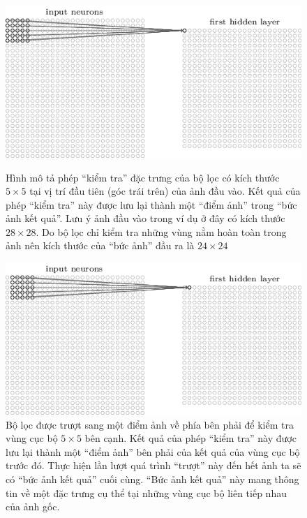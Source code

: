	\begin{figure}
		\centering
		\includegraphics[width=\textwidth]{cnn_first_filter}
		\caption[Phép tính đặc trưng của CNN]{Hình mô tả phép ``kiểm tra'' đặc trưng của bộ lọc có kích thước $5\times5$ tại vị trí đầu tiên (góc trái trên) của ảnh đầu vào.
		Kết quả của phép ``kiểm tra'' này được lưu lại thành một ``điểm ảnh'' trong ``bức ảnh kết quả''.
		Lưu ý ảnh đầu vào trong ví dụ ở đây có kích thước $28\times28$.
		Do bộ lọc chỉ kiểm tra những vùng nằm hoàn toàn trong ảnh nên kích thước của ``bức ảnh'' đầu ra là $24\times24$}
		\label{fig_cnn_filter}
		
		\includegraphics[width=\textwidth]{cnn_second_filter}
		\caption[Phép dịch chuyển bộ lọc của CNN]{Bộ lọc được trượt sang một điểm ảnh về phía bên phải để kiểm tra vùng cục bộ $5\times5$ bên cạnh.
		Kết quả của phép ``kiểm tra'' này được lưu lại thành một ``điểm ảnh'' bên phải của kết quả của vùng cục bộ trước đó.
		Thực hiện lần lượt quá trình ``trượt'' này đến hết ảnh ta sẽ có ``bức ảnh kết quả'' cuối cùng.
		``Bức ảnh kết quả'' này mang thông tin về một đặc trưng cụ thể tại những vùng cục bộ liên tiếp nhau của ảnh gốc.}
		\label{fig_cnn_second_filter}	
	\end{figure}
	
